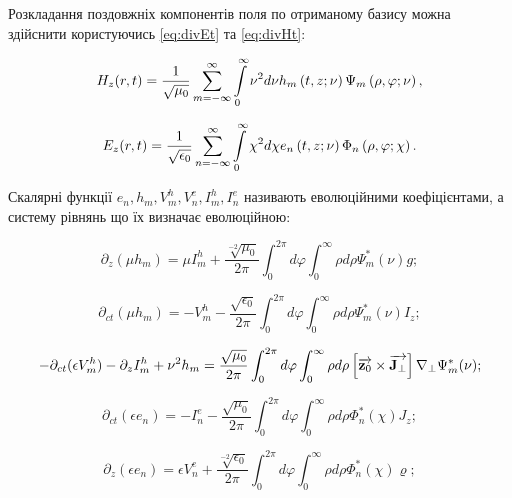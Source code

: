 Розкладання поздовжніх компонентів поля по отриманому базису можна здійснити
користуючись \eqref{eq:divEt} та \eqref{eq:divHt}:

\begin{equation} 
H_z (r,t) = \frac{1}{\sqrt{\mu_0}} \sum \limits_{m=-\infty}^\infty
\int \limits_0^\infty \nu^2 d \nu 
h_m \left( t, z; \nu \right) \Psi_m \left( \rho, \varphi; \nu \right),
\end{equation}

\begin{equation} 
E_z (r,t) = \frac{1}{\sqrt{\epsilon_0}} \sum \limits_{n=-\infty}^\infty
\int \limits_0^\infty \chi^2 d \chi 
e_n \left( t, z; \nu \right)  \Phi_n \left( \rho, \varphi; \chi \right).
\end{equation}

Скалярні функції $ e_n, h_m, V_m^h, V_n^e, I_m^h, I_n^e  $ називають 
еволюційними коефіцієнтами, а систему рівнянь що їх визначає еволюційною:

\begin{equation} \label{eq:evo1}
\partial_z (\mu h_m) = \mu I_m^h + \frac{\sqrt[-2]{\mu_0}}{2 \pi}
\int_0^{2\pi} d \varphi \int_0^{\infty} \rho d \rho
\Psi_m^* (\nu) g;
\end{equation}

\begin{equation} \label{eq:evo2}
\partial_{ct} (\mu h_m) = - V_m^h - \frac{\sqrt{\epsilon_0}}{2 \pi}
\int_0^{2\pi} d \varphi \int_0^{\infty} \rho d \rho
\Psi_m^* (\nu) I_z;
\end{equation}

\begin{equation} \label{eq:evo3}
- \partial_{ct} (\epsilon V_m^h) - \partial_z I_m^h + \nu^2 h_m = 
\frac{\sqrt{\mu_0}}{2 \pi} \int_0^{2\pi} d \varphi 
\int_0^{\infty} \rho d \rho \left[ \overrightarrow{\mathbf z_0} \times \overrightarrow{\mathbf J_\perp} \right]
\nabla_\perp \Psi_m^* (\nu);
\end{equation}

\begin{equation} \label{eq:evo4}
\partial_{ct} (\epsilon e_n) = - I_n^e - 
\frac{\sqrt{\mu_0}}{2 \pi} \int_0^{2\pi} d \varphi 
\int_0^{\infty} \rho d \rho \Phi_n^* (\chi) J_z;
\end{equation}

\begin{equation} \label{eq:evo5}
\partial_{z} (\epsilon e_n) = \epsilon V_n^e + 
\frac{\sqrt[-2]{\epsilon_0}}{2 \pi} \int_0^{2\pi} d \varphi 
\int_0^{\infty} \rho d \rho \Phi_n^* (\chi) \varrho;
\end{equation}

